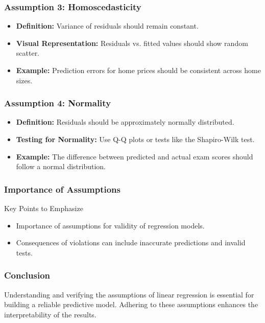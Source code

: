 \documentclass[aspectratio=169]{beamer}
\begin{document}
\begin{frame}[fragile]
    \frametitle{Assumption 3: Homoscedasticity}
    \begin{itemize}
        \item \textbf{Definition:} Variance of residuals should remain constant.
        \item \textbf{Visual Representation:} Residuals vs. fitted values should show random scatter.
        \item \textbf{Example:} Prediction errors for home prices should be consistent across home sizes.
    \end{itemize}
\end{frame}

\begin{frame}[fragile]
    \frametitle{Assumption 4: Normality}
    \begin{itemize}
        \item \textbf{Definition:} Residuals should be approximately normally distributed.
        \item \textbf{Testing for Normality:} Use Q-Q plots or tests like the Shapiro-Wilk test.
        \item \textbf{Example:} The difference between predicted and actual exam scores should follow a normal distribution.
    \end{itemize}
\end{frame}

\begin{frame}[fragile]
    \frametitle{Importance of Assumptions}
    \begin{block}{Key Points to Emphasize}
        \begin{itemize}
            \item Importance of assumptions for validity of regression models.
            \item Consequences of violations can include inaccurate predictions and invalid tests.
        \end{itemize}
    \end{block}
\end{frame}

\begin{frame}[fragile]
    \frametitle{Conclusion}
    Understanding and verifying the assumptions of linear regression is essential for building a reliable predictive model. Adhering to these assumptions enhances the interpretability of the results.
\end{frame}
\end{document}
